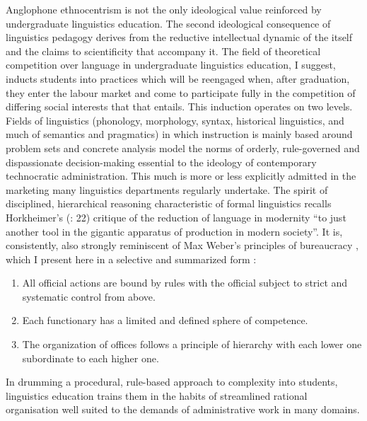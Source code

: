 \documentclass[output=paper]{langscibook}
\begin{document}
Anglophone ethnocentrism is not the only ideological value reinforced by undergraduate linguistics education. The second ideological consequence of linguistics pedagogy derives from the reductive intellectual dynamic of the  itself and the claims to scientificity that accompany it. The field of theoretical competition over language in undergraduate linguistics education, I suggest, inducts students into practices which will be reengaged when, after graduation, they enter the labour market and come to participate fully in the competition of differing social interests that that entails. This induction operates on two levels. Fields of linguistics (phonology, morphology, syntax, historical linguistics, and much of semantics and pragmatics) in which instruction is mainly based around problem sets and concrete analysis model the norms of orderly, rule-governed and dispassionate decision-making essential to the ideology of contemporary technocratic administration. This much is more or less explicitly admitted in the marketing many linguistics departments regularly undertake. The spirit of disciplined, hierarchical reasoning characteristic of formal linguistics recalls Horkheimer's (\citeyear{Horkheimer19921947}: 22) critique of the reduction of language in modernity ``to just another tool in the gigantic apparatus of production in modern society''. It is, consistently, also strongly reminiscent of Max Weber's principles of bureaucracy \citep[329--341]{Weber1947}, which I present here in a selective and summarized form \citep[177--178]{Blackburn1967}:

\begin{enumerate}
    \item All official actions are bound by rules with the official subject to strict and systematic control from above.
    \item Each functionary has a limited and defined sphere of competence.
    \item The organization of offices follows a principle of hierarchy with each lower one subordinate to each higher one.
\end{enumerate}

\noindent In drumming a procedural, rule-based approach to complexity into students, linguistics education trains them in the habits of streamlined rational organisation well suited to the demands of administrative work in many domains.
\end{document}
